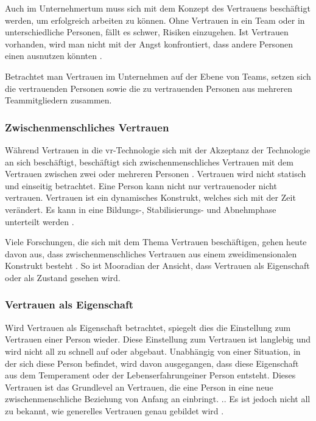 \documentclass[a4paper,11pt]{article}%
\renewcommand{\\}{\vspace*{0.5\baselineskip} \newline}
\begin{document}
Auch im Unternehmertum muss sich mit dem Konzept des Vertrauens beschäftigt werden, um erfolgreich arbeiten zu können. Ohne Vertrauen in ein Team oder in unterschiedliche Personen, fällt es schwer, Risiken einzugehen. Ist Vertrauen vorhanden, wird man nicht mit der Angst konfrontiert, dass andere Personen einen ausnutzen könnten \citep[p.1152]{breuer2016does}.

Betrachtet man Vertrauen im Unternehmen auf der Ebene von Teams, setzen sich die vertrauenden Personen sowie die zu vertrauenden Personen aus mehreren Teammitgliedern zusammen.
 

		\subsubsection{Zwischenmenschliches Vertrauen}
Während Vertrauen in die \ac{vr}-Technologie sich mit der Akzeptanz der Technologie an sich beschäftigt, beschäftigt sich zwischenmenschliches Vertrauen mit dem Vertrauen zwischen zwei oder mehreren Personen \citep{mcknight2011trust}.
Vertrauen wird nicht statisch und einseitig betrachtet. Eine Person kann nicht nur \dq vertrauen\dq oder \dq nicht vertrauen\dq. Vertrauen ist ein dynamisches Konstrukt, welches sich mit der Zeit verändert. Es kann in eine Bildungs-, Stabilisierungs- und Abnehmphase unterteilt werden \citep[p.396]{rousseau1998not}.

Viele Forschungen, die sich mit dem Thema Vertrauen beschäftigen, gehen heute davon aus, dass zwischenmenschliches Vertrauen aus einem zweidimensionalen Konstrukt besteht \citep{johnson2005cognitive} \citep{cook1980new}. So ist Mooradian \citep[p.524-525]{mooradian2006trusts} der Ansicht, dass Vertrauen als \dq{}Eigenschaft\dq{} oder als \dq{}Zustand\dq{} gesehen wird.

	\subsubsection{Vertrauen als Eigenschaft }

Wird Vertrauen als Eigenschaft betrachtet, spiegelt dies die Einstellung zum Vertrauen einer Person wieder. Diese Einstellung zum Vertrauen ist langlebig und wird nicht all zu schnell auf oder abgebaut. Unabhängig von einer Situation, in der sich diese Person befindet, wird davon ausgegangen, dass diese Eigenschaft aus dem Temperament oder der Lebenserfahrungeiner Person entsteht. Dieses Vertrauen ist das Grundlevel an Vertrauen, die eine Person in eine neue zwischenmenschliche Beziehung von Anfang an einbringt. \citep[p.11]{couch1996assessment}.. Es ist jedoch nicht all zu bekannt, wie generelles Vertrauen genau gebildet wird \citep[p.409]{stolle2002trusting}.
\end{document}
